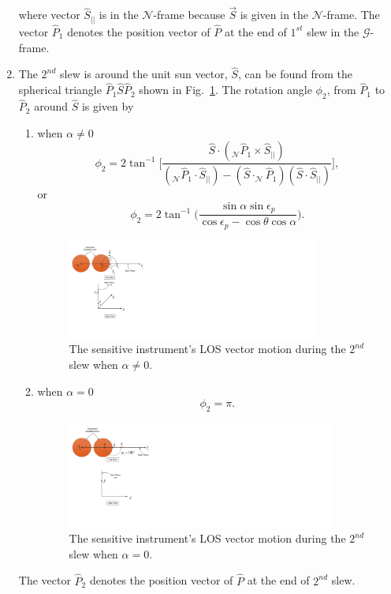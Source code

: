 \documentclass[journal ]{new-aiaa}
\begin{document}
\begin{enumerate}[label=\Roman*)]
		 where vector $\hat{S}_{||}$ is in the $\mathcal{N}$-frame because $\vec{S}$ is given in the $\mathcal{N}$-frame. %
The vector $\hat{P}_1$ denotes the position vector of $\hat{P}$ at the end of $1^{st}$ slew in the $\mathcal{G}$-frame.
		\item The $2^{nd}$ slew is around the unit sun vector, $\hat{S}$, can be found from the spherical triangle $\hat{P}_1\hat{S}\hat{P}_2$ shown in Fig.~\ref{sphericaltriangle}. The rotation angle $\phi_2$, from $\hat{P}_1$ to $\hat{P}_2$ around $\hat{S}$ is given by\cite{Wertz2011} 
		\begin{enumerate}
			\item when $\alpha\neq 0$
	\begin{equation}
	\phi_2=2\tan^{-1}\Big[ \frac{\hat{S}\cdot (_\mathcal{N}\hat{P}_1\times\hat{S}_{||})}{(_\mathcal{N}\hat{P}_1\cdot\hat{S}_{||})-(\hat{S}\cdot_\mathcal{N}\hat{P}_1)(\hat{S}\cdot\hat{S}_{||})}\Big], 
	\end{equation}
or
	\begin{equation} 
	\phi_2=2\tan^{-1}\Big( \frac{\sin\alpha \sin\epsilon_p}{\cos\epsilon_p-\cos\theta\cos\alpha}\Big).
	\end{equation}
			\begin{figure}[h!]
				\centering
					\includegraphics[width=3.25in]{SVAS_2r_modified}
					\caption{The sensitive instrument's LOS vector motion during the $2^{nd}$ slew when $\alpha\neq 0$.}
					\label{sphericaltriangle}
			\end{figure}			
			\item when $\alpha=0$
			\begin{equation}
				\phi_2 = \pi.
			\end{equation}
			\begin{figure}[h!]
				\centering
					\includegraphics[width=3.5in]{SVAS_3r_modified}
						\caption{The sensitive instrument's LOS vector motion during the $2^{nd}$ slew when $\alpha= 0$.}
			\end{figure}
		\end{enumerate}
		The vector $\hat{P}_2$ denotes the position vector of $\hat{P}$ at the end of $2^{nd}$ slew.
		

\end{enumerate}
\end{document}
